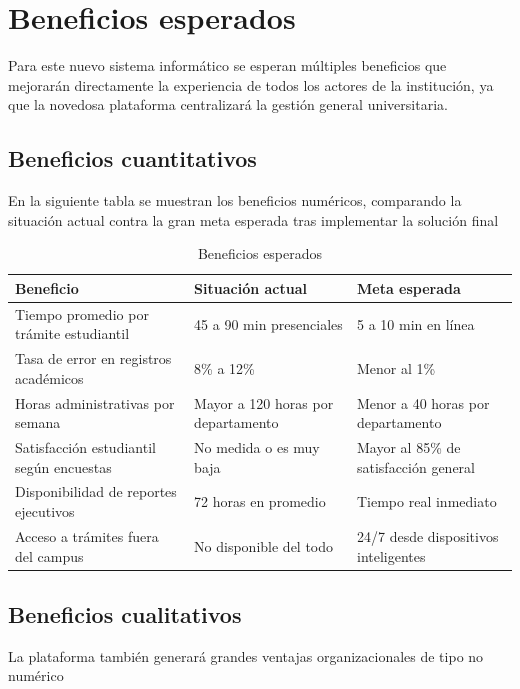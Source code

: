 \documentclass[11pt,spanish]{article}
\begin{document}
\section{Beneficios esperados}

Para este nuevo sistema informático se esperan múltiples beneficios que mejorarán directamente la experiencia de todos los actores de la institución, ya que la novedosa plataforma centralizará la gestión general universitaria.

\subsection{Beneficios cuantitativos}

En la siguiente tabla se muestran los beneficios numéricos, comparando la situación actual contra la gran meta esperada tras implementar la solución final

\begin{table}[H]
\centering
\small
\caption{Beneficios esperados}\label{tab:beneficios}
\begin{tabularx}{\textwidth}{p{5.2cm} p{4.1cm} Y}
\toprule
\textbf{Beneficio} & \textbf{Situación actual} & \textbf{Meta esperada} \\
\midrule
Tiempo promedio por trámite estudiantil & 45 a 90 min presenciales & 5 a 10 min en línea \\
Tasa de error en registros académicos & 8\% a 12\% & Menor al 1\% \\
Horas administrativas por semana & Mayor a 120 horas por departamento & Menor a 40 horas por departamento \\
Satisfacción estudiantil según encuestas & No medida o es muy baja & Mayor al 85\% de satisfacción general \\
Disponibilidad de reportes ejecutivos & 72 horas en promedio & Tiempo real inmediato \\
Acceso a trámites fuera del campus & No disponible del todo & 24/7 desde dispositivos inteligentes \\
\bottomrule
\end{tabularx}
\end{table}

\subsection{Beneficios cualitativos}

La plataforma también generará grandes ventajas organizacionales de tipo no numérico
\end{document}
